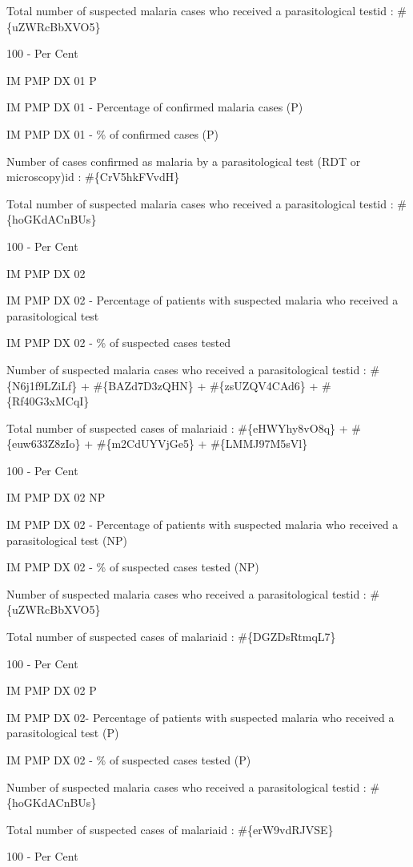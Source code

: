 \documentclass[]{book}
\begin{document}
Total number of suspected malaria cases who received a parasitological testid : \#\{uZWRcBbXVO5\}

100 - Per Cent

IM PMP DX 01 P

IM PMP DX 01 - Percentage of confirmed malaria cases (P)

IM PMP DX 01 - \% of confirmed cases (P)

Number of cases confirmed as malaria by a parasitological test (RDT or microscopy)id : \#\{CrV5hkFVvdH\}

Total number of suspected malaria cases who received a parasitological testid : \#\{hoGKdACnBUs\}

100 - Per Cent

IM PMP DX 02

IM PMP DX 02 - Percentage of patients with suspected malaria who received a parasitological test

IM PMP DX 02 - \% of suspected cases tested

Number of suspected malaria cases who received a parasitological testid : \#\{N6j1f9LZiLf\} + \#\{BAZd7D3zQHN\} + \#\{zsUZQV4CAd6\} + \#\{Rf40G3xMCqI\}

Total number of suspected cases of malariaid : \#\{eHWYhy8vO8q\} + \#\{euw633Z8zIo\} + \#\{m2CdUYVjGe5\} + \#\{LMMJ97M5sVl\}

100 - Per Cent

IM PMP DX 02 NP

IM PMP DX 02 - Percentage of patients with suspected malaria who received a parasitological test (NP)

IM PMP DX 02 - \% of suspected cases tested (NP)

Number of suspected malaria cases who received a parasitological testid : \#\{uZWRcBbXVO5\}

Total number of suspected cases of malariaid : \#\{DGZDsRtmqL7\}

100 - Per Cent

IM PMP DX 02 P

IM PMP DX 02- Percentage of patients with suspected malaria who received a parasitological test (P)

IM PMP DX 02 - \% of suspected cases tested (P)

Number of suspected malaria cases who received a parasitological testid : \#\{hoGKdACnBUs\}

Total number of suspected cases of malariaid : \#\{erW9vdRJVSE\}

100 - Per Cent
\end{document}
